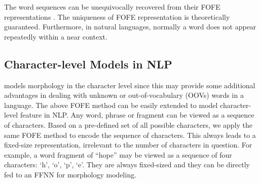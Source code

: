 \documentclass[11pt,a4paper]{article}
\newtheorem{theorem}{Theorem}
\begin{document}
The word sequences can be unequivocally recovered from their FOFE representations \cite{zhang2015fixed}.
The uniqueness of FOFE representation is theoretically guaranteed.
Furthermore, in natural languages, normally a word does not appear repeatedly within a near context. 


\subsection {Character-level Models in NLP}
\label{subsec_char_feature}

 models morphology in the character level since this may provide some additional advantages in dealing with unknown or out-of-vocabulary (OOVs) words in a language.
The above FOFE method can be easily extended to model character-level feature in NLP. Any word, phrase or fragment can be viewed as a sequence of characters. Based on a pre-defined set of all possible characters, we apply the same FOFE method to encode the sequence of characters. This always leads to a fixed-size representation, irrelevant to the number of characters in question. 
For example, a word fragment of ``hope'' may be viewed as a 
sequence of four characters: `h', `o', `p', `e'.
They are
always fixed-sized and they can be directly fed to an FFNN for morphology modeling. 
\end{document}
